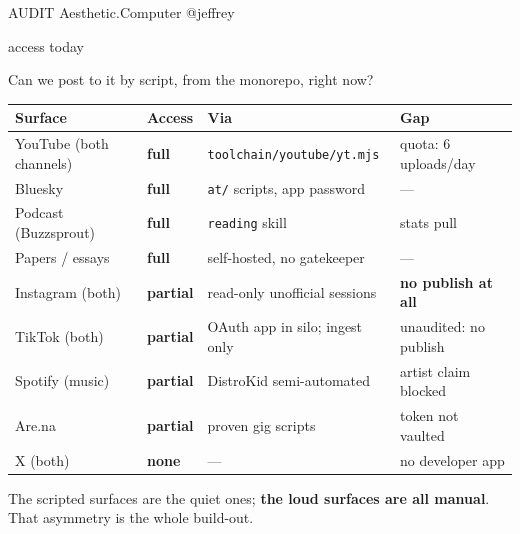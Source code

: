 \documentclass[12pt]{article}
\makeatletter
\newcommand{\okfull}{{\color{acgreen}\textbf{full}}}
\newcommand{\okpart}{{\color{acamber}\textbf{partial}}}
\newcommand{\oknone}{{\color{acred}\textbf{none}}}
\newcommand{\ac}{Aesthetic\textcolor{acpink}{.}Computer}
\newenvironment{slide}[2]{%
  \clearpage
  {\footnotesize\color{acgray}\MakeUppercase{#1}\hfill}%
  {\footnotesize\color{acgray}\ac{} \textperiodcentered{} @jeffrey}\par
  \vspace{0.1em}
  {\acbold\fontsize{31pt}{35pt}\selectfont\color{acdark}#2\par}
  \vspace{0.9em}
  \large
}{%
  \vfill
  {\hfill\footnotesize\color{acgray}\thepage}%
}
\makeatother
\begin{document}
\begin{slide}{audit}{access today}
Can we post to it by script, from the monorepo, right now?

\vspace{0.8em}
\begin{center}
\normalsize
\begin{tabular}{@{}llll@{}}
\toprule
\textbf{Surface} & \textbf{Access} & \textbf{Via} & \textbf{Gap} \\
\midrule
YouTube (both channels) & \okfull & \texttt{toolchain/youtube/yt.mjs} & quota: 6 uploads/day \\
Bluesky & \okfull & \texttt{at/} scripts, app password & --- \\
Podcast (Buzzsprout) & \okfull & \texttt{reading} skill & stats pull \\
Papers / essays & \okfull & self-hosted, no gatekeeper & --- \\
Instagram (both) & \okpart & read-only unofficial sessions & \textbf{no publish at all} \\
TikTok (both) & \okpart & OAuth app in silo; ingest only & unaudited: no publish \\
Spotify (music) & \okpart & DistroKid semi-automated & artist claim blocked \\
Are.na & \okpart & proven gig scripts & token not vaulted \\
X (both) & \oknone & --- & no developer app \\
\bottomrule
\end{tabular}
\end{center}

\vspace{0.9em}
The scripted surfaces are the quiet ones; \textbf{the loud surfaces are all manual}. That asymmetry is the whole build-out.
\end{slide}
\end{document}
